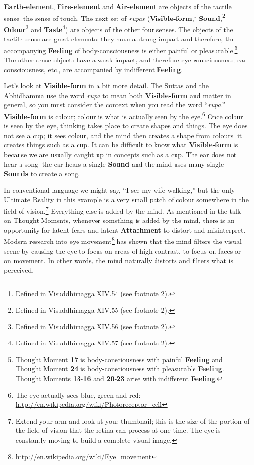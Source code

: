 \textbf{Earth-element}, \textbf{Fire-element} and \textbf{Air-element} are objects of the tactile sense, the sense of touch. The next set of \textit{rūpas} (\textbf{Visible-form},\footnote{Defined in Visuddhimagga XIV.54 (see footnote 2).} \textbf{Sound},\footnote{Defined in Visuddhimagga XIV.55 (see footnote 2).} \textbf{Odour}\footnote{Defined in Visuddhimagga XIV.56 (see footnote 2).} and \textbf{Taste}\footnote{Defined in Visuddhimagga XIV.57 (see footnote 2).}) are objects of the other four senses. The objects of the tactile sense are great elements; they have a strong impact and therefore, the accompanying \textbf{Feeling} of body-consciousness is either painful or pleasurable.\footnote{Thought Moment \textbf{17} is body-consciousness with painful \textbf{Feeling} and Thought Moment \textbf{24} is body-consciousness with pleasurable \textbf{Feeling}. Thought Moments \textbf{13}-\textbf{16} and \textbf{20}-\textbf{23} arise with indifferent \textbf{Feeling}.} The other sense objects have a weak impact, and therefore eye-consciousness, ear-consciousness, etc., are accompanied by indifferent \textbf{Feeling}.

Let’s look at \textbf{Visible-form} in a bit more detail. The Suttas and the Abhidhamma use the word \textit{rūpa} to mean both \textbf{Visible-form} and matter in general, so you must consider the context when you read the word “\textit{rūpa}.” \textbf{Visible-form} is colour; colour is what is actually seen by the eye.\footnote{The eye actually sees blue, green and red: \url{http://en.wikipedia.org/wiki/Photoreceptor_cell}} Once colour is seen by the eye, thinking takes place to create shapes and things. The eye does not see a cup; it sees colour, and the mind then creates a shape from colours; it creates things such as a cup. It can be difficult to know what \textbf{Visible-form} is because we are usually caught up in concepts such as a cup. The ear does not hear a song, the ear hears a single \textbf{Sound} and the mind uses many single \textbf{Sounds} to create a song.

In conventional language we might say, “I see my wife walking,” but the only Ultimate Reality in this example is a very small patch of colour somewhere in the field of vision.\footnote{Extend your arm and look at your thumbnail; this is the size of the portion of the field of vision that the retina can process at one time. The eye is constantly moving to build a complete visual image.} Everything else is added by the mind. As mentioned in the talk on Thought Moments, whenever something is added by the mind, there is an opportunity for latent fears and latent \textbf{Attachment} to distort and misinterpret. Modern research into eye movement\footnote{\url{http://en.wikipedia.org/wiki/Eye_movement}} has shown that the mind filters the visual scene by causing the eye to focus on areas of high contrast, to focus on faces or on movement. In other words, the mind naturally distorts and filters what is perceived.

